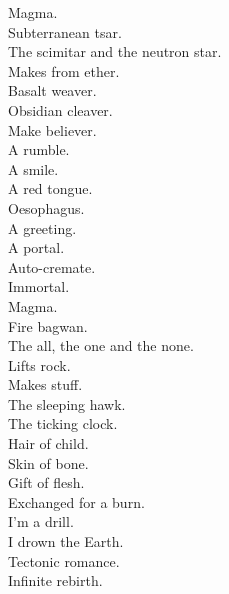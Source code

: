 Magma. \\
Subterranean tsar. \\
The scimitar and the neutron star. \\
Makes from ether. \\
Basalt weaver. \\
Obsidian cleaver. \\
Make believer. \\

A rumble. \\
A smile. \\
A red tongue. \\
Oesophagus. \\
A greeting. \\
A portal. \\
Auto-cremate. \\
Immortal. \\

Magma. \\
Fire bagwan. \\
The all, the one and the none. \\
Lifts rock. \\
Makes stuff. \\
The sleeping hawk. \\
The ticking clock. \\
Hair of child. \\
Skin of bone. \\
Gift of flesh. \\
Exchanged for a burn. \\
I'm a drill. \\
I drown the Earth. \\
Tectonic romance. \\
Infinite rebirth. \\

